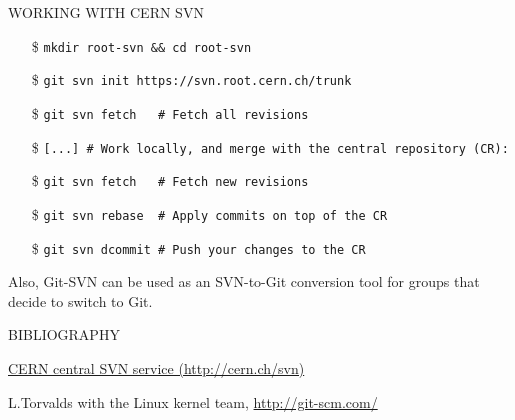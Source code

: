 \documentclass[final,hyperref={pdfpagelabels=false},notitlepage=true]{beamer}
\begin{document}
\begin{frame}{}
\begin{columns}[t]
\begin{column}{0.45\linewidth}
\begin{block}{\large WORKING WITH CERN SVN}
          \vskip1cm
          \begin{itemize}
            \item[\$] {\tt mkdir root-svn \&\& cd root-svn}
            \item[\$] {\tt git svn init https://svn.root.cern.ch/trunk}
            \item[\$] {\tt git svn fetch \ \ \# Fetch all revisions}
              \vskip1cm
            \item[\$] {\tt [...] \# Work locally, and merge with the central repository (CR):}
              \vskip1cm
            \item[\$] {\tt git svn fetch \ \ \# Fetch new revisions}
            \item[\$] {\tt git svn rebase \ \# Apply commits on top of the CR}
            \item[\$] {\tt git svn dcommit \# Push your changes to the CR}
          \end{itemize}

\vspace{1cm}
          Also, Git-SVN {\color{orange} can be used as an SVN-to-Git conversion tool}
          for groups that decide to switch to Git.
	\end{block}

\vspace{2cm}

    \vskip-1.5cm
\begin{block}{\large BIBLIOGRAPHY}
    \vskip-0.5cm
\begin{thebibliography}{9}
\href{http://cern.ch/svn}{CERN central SVN service (http://cern.ch/svn)}

L.Torvalds with the Linux kernel team, \href{http://git-scm.com/}{http://git-scm.com/}


\end{thebibliography}
\end{block}
    \vfill
    \end{column}
    \end{columns}
  \end{frame}
\end{document}
